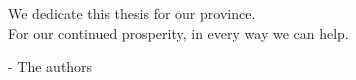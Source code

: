 \begin{dedication}
\null{}

\begin{flushright}
	\begin{calligra}
	\Large 
	
	We dedicate this thesis for our province. \\
	For our continued prosperity, in every way we can help.

	\end{calligra}

- The authors
\end{flushright}




	


\end{dedication}
